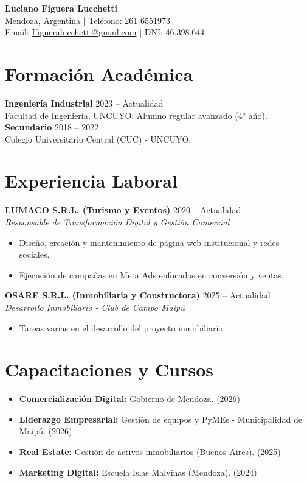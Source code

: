 \documentclass[11pt,a4paper]{article}
\begin{document}
\begin{center}
    {\Huge \textbf{Luciano Figuera Lucchetti}} \\
    \vspace{2mm}
    Mendoza, Argentina | Teléfono: 261 6551973 \\
    Email: \href{mailto:Ifigueralucchetti@gmail.com}{Ifigueralucchetti@gmail.com} | DNI: 46.398.644
\end{center}

\section*{Formación Académica}
\textbf{Ingeniería Industrial} \hfill 2023 -- Actualidad \\
Facultad de Ingeniería, UNCUYO. Alumno regular avanzado (4° año). \\
\vspace{1mm}
\textbf{Secundario} \hfill 2018 -- 2022 \\
Colegio Universitario Central (CUC) - UNCUYO.

\section*{Experiencia Laboral}
\textbf{LUMACO S.R.L. (Turismo y Eventos)} \hfill 2020 -- Actualidad \\
\textit{Responsable de Transformación Digital y Gestión Comercial}
\begin{itemize}
    \item Diseño, creación y mantenimiento de página web institucional y redes sociales.
    \item Ejecución de campañas en Meta Ads enfocadas en conversión y ventas.
\end{itemize}
\vspace{2mm}
\textbf{OSARE S.R.L. (Inmobiliaria y Constructora)} \hfill 2025 -- Actualidad \\
\textit{Desarrollo Inmobiliario - Club de Campo Maipú}
\begin{itemize}
    \item Tareas varias en el desarrollo del proyecto inmobiliario.
\end{itemize}

\section*{Capacitaciones y Cursos}
\begin{itemize}
    \item \textbf{Comercialización Digital:} Gobierno de Mendoza. (2026)
    \item \textbf{Liderazgo Empresarial:} Gestión de equipos y PyMEs - Municipalidad de Maipú. (2026)
    \item \textbf{Real Estate:} Gestión de activos inmobiliarios (Buenos Aires). (2025)
    \item \textbf{Marketing Digital:} Escuela Islas Malvinas (Mendoza). (2024)
\end{itemize}
\end{document}
